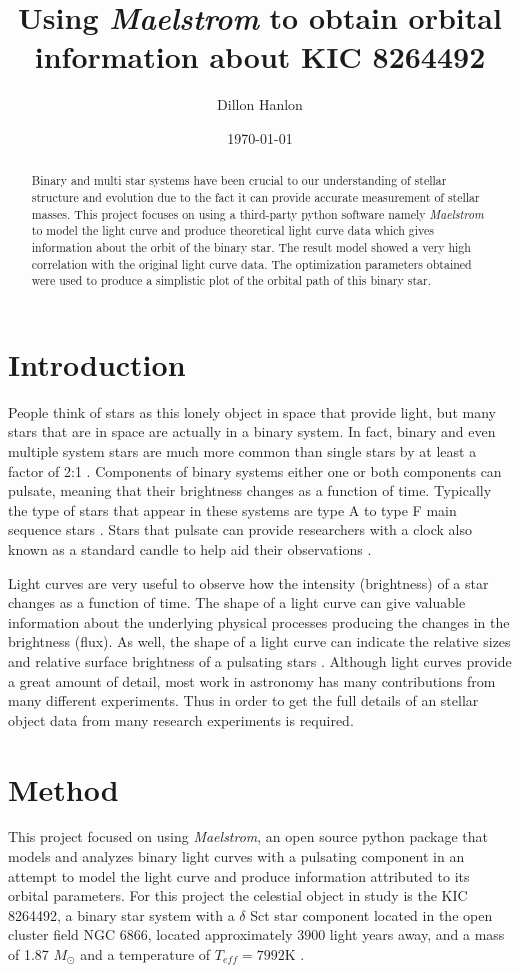\documentclass[]{article}
\title{Using \textit{Maelstrom} to obtain orbital information about KIC 8264492 }
\author{Dillon Hanlon}
\date{\today}
\begin{document}
\maketitle
\begin{abstract}
    Binary and multi star systems have been crucial to our understanding of stellar structure and evolution due to the fact it can provide accurate measurement of stellar masses.
    This project focuses on using a third-party python software namely \textit{Maelstrom} to model the light curve and produce theoretical light curve data which gives information about the orbit of the binary star. 
    The result model showed a very high correlation with the original light curve data. The optimization parameters obtained were used to produce a simplistic plot of the orbital path of this binary star. 
\end{abstract}
\section{Introduction}
People think of stars as this lonely object in space that provide light, but many stars that are in space are actually in a binary system.
In fact, binary and even multiple system stars are much more common than single stars by at least a factor of 2:1 \cite{guszejnov2017protostellar}.
Components of binary systems either one or both components can pulsate, meaning that their brightness changes as a function of time. Typically the type of stars that appear in these systems are type A to type F main sequence stars \cite{garg2010high}.
Stars that pulsate can provide researchers with a clock also known as a standard candle to help aid their observations \cite{murphy2018finding}. 

Light curves are very useful to observe how the intensity (brightness) of a star changes as a function of time.
The shape of a light curve can give valuable information about the underlying physical processes producing the changes in the brightness (flux). 
As well, the shape of a light curve can indicate the relative sizes  and relative surface brightness of a pulsating stars \cite{russell1912determination}. Although light curves provide a great amount of detail, most work in astronomy has many contributions from many different experiments. Thus in order to get the full details of an stellar object data from many research experiments is required.

\section{Method}
This project focused on using \textit{Maelstrom}, an open source python package that models and analyzes binary light curves with a pulsating component in an attempt to model the light curve and produce information attributed to its orbital parameters. 
For this project the celestial object in study is the KIC 8264492, a binary star system with a $\delta$ Sct star component located in the open cluster field NGC 6866, located approximately 3900 light years away, and a mass of 1.87 $M_{\odot}$ and a temperature of $T_{eff} = 7992$K \cite{balona2013pulsation,shibahashi2015fm}.
\end{document}
